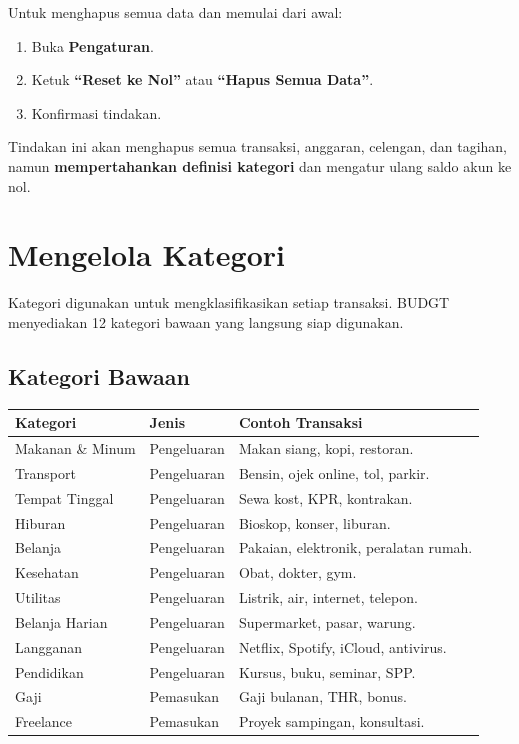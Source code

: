 \documentclass[12pt, a4paper]{article}
\begin{document}
Untuk menghapus semua data dan memulai dari awal:
\begin{enumerate}[leftmargin=1.5em]
  \item Buka \textbf{Pengaturan}.
  \item Ketuk \textbf{``Reset ke Nol''} atau \textbf{``Hapus Semua Data''}.
  \item Konfirmasi tindakan.
\end{enumerate}

Tindakan ini akan menghapus semua transaksi, anggaran, celengan, dan tagihan, namun \textbf{mempertahankan definisi kategori} dan mengatur ulang saldo akun ke nol.

\section{Mengelola Kategori}

Kategori digunakan untuk mengklasifikasikan setiap transaksi. BUDGT menyediakan 12 kategori bawaan yang langsung siap digunakan.

\subsection{Kategori Bawaan}

\begin{longtable}{L{4cm} C{2.5cm} L{7.5cm}}
  \toprule
  \textbf{Kategori} & \textbf{Jenis} & \textbf{Contoh Transaksi} \\
  \midrule
  \endhead
  Makanan \& Minum & Pengeluaran & Makan siang, kopi, restoran. \\[3pt]
  Transport & Pengeluaran & Bensin, ojek online, tol, parkir. \\[3pt]
  Tempat Tinggal & Pengeluaran & Sewa kost, KPR, kontrakan. \\[3pt]
  Hiburan & Pengeluaran & Bioskop, konser, liburan. \\[3pt]
  Belanja & Pengeluaran & Pakaian, elektronik, peralatan rumah. \\[3pt]
  Kesehatan & Pengeluaran & Obat, dokter, gym. \\[3pt]
  Utilitas & Pengeluaran & Listrik, air, internet, telepon. \\[3pt]
  Belanja Harian & Pengeluaran & Supermarket, pasar, warung. \\[3pt]
  Langganan & Pengeluaran & Netflix, Spotify, iCloud, antivirus. \\[3pt]
  Pendidikan & Pengeluaran & Kursus, buku, seminar, SPP. \\[3pt]
  Gaji & Pemasukan & Gaji bulanan, THR, bonus. \\[3pt]
  Freelance & Pemasukan & Proyek sampingan, konsultasi. \\
  \bottomrule
\end{longtable}
\end{document}
